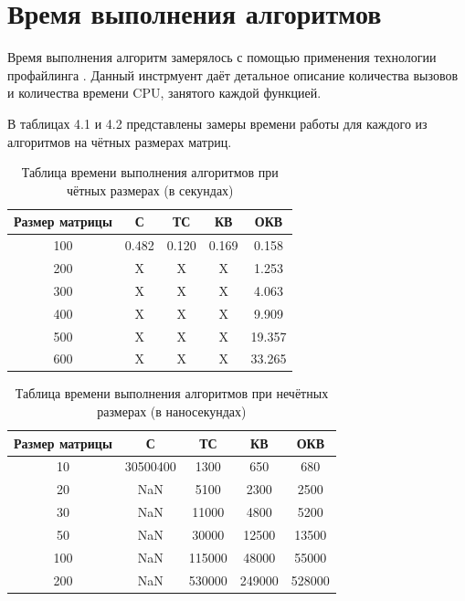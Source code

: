 \documentclass[12pt]{report}
\begin{document}
\section{Время выполнения алгоритмов}
Время выполнения алгоритм замерялось с помощью применения технологии профайлинга \cite{profiling}. Данный инстрмуент даёт детальное описание количества вызовов и количества времени CPU, занятого каждой функцией. \newline

В таблицах 4.1 и 4.2 представлены замеры времени работы для каждого из алгоритмов на чётных размерах матриц.

\begin{table} [h!]
	\caption{Таблица времени выполнения алгоритмов при чётных размерах (в секундах)}
	\begin{center}
		\begin{tabular}{|c c c c c|} 
		 	\hline
			Размер матрицы & С & ТС & КВ & ОКВ \\  
		 	\hline
		 	100 & 0.482 & 0.120 & 0.169 & 0.158 \\
		 	\hline
		 	200 & X & X & X & 1.253 \\
		 	\hline
			300 & X & X & X & 4.063 \\
			\hline
			400 & X & X & X & 9.909 \\
			\hline
			500 & X & X & X & 19.357 \\
			\hline
			600 & X & X & X & 33.265 \\
			\hline
		\end{tabular}
	\end{center}
\end{table}

\begin{table} [h!]
	\caption{Таблица времени выполнения алгоритмов при нечётных размерах (в наносекундах)}
	\begin{center}
		\begin{tabular}{|c c c c c|} 
			\hline
			Размер матрицы & С & ТС & КВ & ОКВ \\  
			\hline
			10 & 30500400 & 1300 & 650 & 680\\
			\hline
			20 & NaN & 5100 & 2300 & 2500 \\
			\hline
			30 & NaN & 11000 & 4800 & 5200 \\
			\hline
			50 & NaN & 30000 & 12500 & 13500 \\
			\hline
			100 & NaN & 115000 & 48000 & 55000\\
			\hline
			200 & NaN & 530000 & 249000 & 528000 \\
			\hline
		\end{tabular}
	\end{center}
\end{table}
\end{document}
